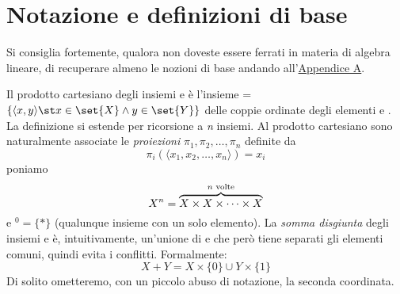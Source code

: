 \section{Notazione e definizioni di base}
Si consiglia fortemente, qualora non doveste essere ferrati in materia di algebra lineare, di recuperare almeno le nozioni di base andando all'\hyperref[sec:algebra]{Appendice A}.

Il prodotto cartesiano degli insiemi  e  è l'insieme  = $\{\langle x, y \rangle \st x \in \set{X} \land y \in \set{Y}\}$ delle coppie ordinate degli elementi  e . La definizione si estende per ricorsione a \textit{n} insiemi. Al prodotto cartesiano  sono naturalmente associate le \textit{proiezioni} $\pi_1, \pi_2, \dots, \pi_n$ definite da
\begin{equation}
    \pi_i(\langle x_1, x_2, \dots, x_n \rangle) = x_i
\end{equation}
poniamo
\begin{equation}
    X^n = \overbrace{X \times X \times \dots \times X}^{\textnormal{$n$ volte}}
\end{equation}
e $^0 = \{*\}$ (qualunque insieme con un solo elemento). La \textit{somma disgiunta} degli insiemi  e  è, intuitivamente, un'unione di  e  che però tiene separati gli elementi comuni, quindi evita i conflitti. Formalmente:
\begin{equation}
    X + Y = X \times \{0\} \cup Y \times \{1\}
\end{equation}
Di solito ometteremo, con un piccolo abuso di notazione, la seconda coordinata.

